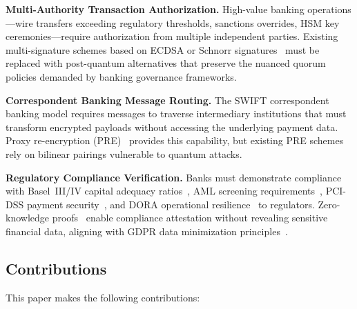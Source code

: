\documentclass[conference,10pt]{IEEEtran}
\begin{document}
\textbf{Multi-Authority Transaction Authorization.} High-value banking operations---wire transfers exceeding regulatory thresholds, sanctions overrides, HSM key ceremonies---require authorization from multiple independent parties. Existing multi-signature schemes based on ECDSA or Schnorr signatures~\cite{shamir1979share} must be replaced with post-quantum alternatives that preserve the nuanced quorum policies demanded by banking governance frameworks.

\textbf{Correspondent Banking Message Routing.} The SWIFT correspondent banking model requires messages to traverse intermediary institutions that must transform encrypted payloads without accessing the underlying payment data. Proxy re-encryption (PRE)~\cite{blaze1998divertible} provides this capability, but existing PRE schemes rely on bilinear pairings vulnerable to quantum attacks.

\textbf{Regulatory Compliance Verification.} Banks must demonstrate compliance with Basel~III/IV capital adequacy ratios~\cite{baseliii2017}, AML screening requirements~\cite{aml6amld}, PCI-DSS payment security~\cite{pcidss4}, and DORA operational resilience~\cite{dora2022} to regulators. Zero-knowledge proofs~\cite{goldwasser1989knowledge} enable compliance attestation without revealing sensitive financial data, aligning with GDPR data minimization principles~\cite{gdpr2016}.

\subsection{Contributions}

This paper makes the following contributions:
\end{document}
